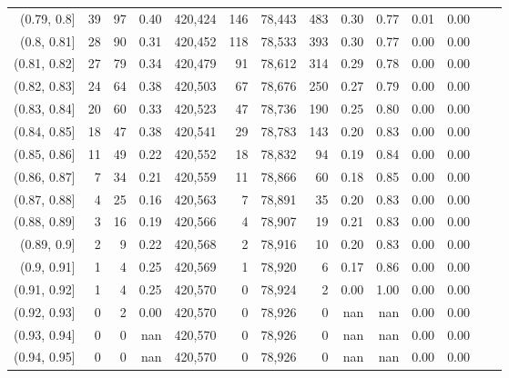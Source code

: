 \begin{tabular}{rrrrrrrrrrrrrr}
(0.79, 0.8]    &      39 &     97 &   0.40 &  420,424 &      146 &  78,443 &     483 &  0.30 &  0.77 &  0.01 &      0.00 \\
(0.8, 0.81]    &      28 &     90 &   0.31 &  420,452 &      118 &  78,533 &     393 &  0.30 &  0.77 &  0.00 &      0.00 \\
(0.81, 0.82]   &      27 &     79 &   0.34 &  420,479 &       91 &  78,612 &     314 &  0.29 &  0.78 &  0.00 &      0.00 \\
(0.82, 0.83]   &      24 &     64 &   0.38 &  420,503 &       67 &  78,676 &     250 &  0.27 &  0.79 &  0.00 &      0.00 \\
(0.83, 0.84]   &      20 &     60 &   0.33 &  420,523 &       47 &  78,736 &     190 &  0.25 &  0.80 &  0.00 &      0.00 \\
(0.84, 0.85]   &      18 &     47 &   0.38 &  420,541 &       29 &  78,783 &     143 &  0.20 &  0.83 &  0.00 &      0.00 \\
(0.85, 0.86]   &      11 &     49 &   0.22 &  420,552 &       18 &  78,832 &      94 &  0.19 &  0.84 &  0.00 &      0.00 \\
(0.86, 0.87]   &       7 &     34 &   0.21 &  420,559 &       11 &  78,866 &      60 &  0.18 &  0.85 &  0.00 &      0.00 \\
(0.87, 0.88]   &       4 &     25 &   0.16 &  420,563 &        7 &  78,891 &      35 &  0.20 &  0.83 &  0.00 &      0.00 \\
(0.88, 0.89]   &       3 &     16 &   0.19 &  420,566 &        4 &  78,907 &      19 &  0.21 &  0.83 &  0.00 &      0.00 \\
(0.89, 0.9]    &       2 &      9 &   0.22 &  420,568 &        2 &  78,916 &      10 &  0.20 &  0.83 &  0.00 &      0.00 \\
(0.9, 0.91]    &       1 &      4 &   0.25 &  420,569 &        1 &  78,920 &       6 &  0.17 &  0.86 &  0.00 &      0.00 \\
(0.91, 0.92]   &       1 &      4 &   0.25 &  420,570 &        0 &  78,924 &       2 &  0.00 &  1.00 &  0.00 &      0.00 \\
(0.92, 0.93]   &       0 &      2 &   0.00 &  420,570 &        0 &  78,926 &       0 &   nan &   nan &  0.00 &      0.00 \\
(0.93, 0.94]   &       0 &      0 &    nan &  420,570 &        0 &  78,926 &       0 &   nan &   nan &  0.00 &      0.00 \\
(0.94, 0.95]   &       0 &      0 &    nan &  420,570 &        0 &  78,926 &       0 &   nan &   nan &  0.00 &      0.00 \\

\end{tabular}
